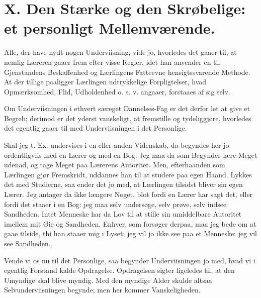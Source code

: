 \documentclass[12pt,a4paper]{book}
\newcommand{\apage}[1]{\marginnote{\footnotesize\textit{[#1]}}}
\begin{document}
\chapter*{X. Den Stærke og den Skrøbelige: et personligt Mellemværende.}
\label{ch:forel10} \apage{105}

Alle, der have nydt nogen Underviisning, vide jo, hvorledes det gaaer til, at
nemlig Læreren gaaer frem efter visse Regler, idet han anvender en til
Gjenstandens Beskaffenhed og Lærlingens Fatteevne hensigtssvarende Methode. At
der tillige paaligger Lærlingen udtrykkelige Forpligtelser, hvad
Opmærksomhed, Flid, Udholdenhed o. s. v. angaaer, forstaaes af sig selv.

Om Underviisningen i ethvert særeget Dannelses-Fag er det derfor let at give
et Begreb; derimod er det yderst vanskeligt, at fremstille og tydeliggjøre,
hvorledes det egentlig gaaer til med Underviisningen i det Personlige.

Skal jeg t. Ex. undervises i en eller anden Videnskab, da begyndes her jo
ordentligviis med en Lærer og med en Bog. Jeg maa da som Begynder lære Meget
udenad, og tage Meget paa Lærerens Autoritet. Men, efterhaanden som
Lærlingen gjør Fremskridt, uddannes han til at studere paa egen Haand.
Lykkes det med Studierne, saa ender det jo med, at Lærlingen tilsidst
bliver sin egen Lærer. Jeg antager da ikke længere Noget, blot fordi en
Lærer har sagt det, eller fordi det staaer i en Bog: jeg maa selv undersøge,
selv prøve, selv indsee Sandheden. Intet Menneske har da Lov til at stille
sin
umiddelbare Autoritet imellem mit Øie og Sandheden. Enhver, som forsøger \apage{106}
derpaa, maa jeg bede om at gaae tilside, thi han staaer mig i Lyset; jeg vil
jo ikke see paa et Menneske: jeg vil see Sandheden.

Vende vi os nu til det Personlige, saa begynder Underviisningen jo med, hvad
vi i egentlig Forstand kalde Opdragelse. Opdragelsen sigter ligeledes til, at
den Umyndige skal blive myndig. Med den myndige Alder skulde altsaa
Selvunderviisningen begynde; men her kommer Vanskeligheden.
\end{document}
